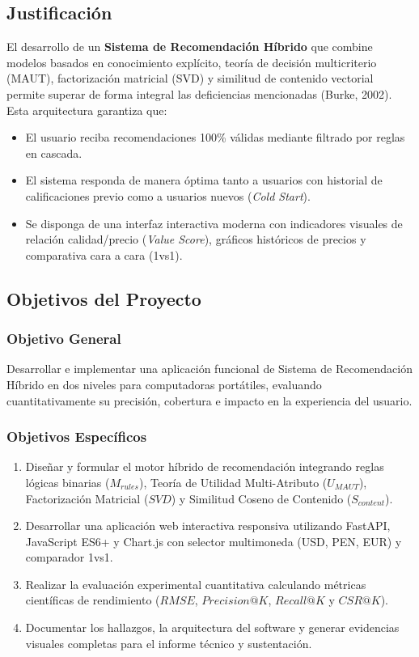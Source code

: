 \documentclass[12pt,a4paper]{article}
\begin{document}
\subsection{Justificación}
El desarrollo de un \textbf{Sistema de Recomendación Híbrido} que combine modelos basados en conocimiento explícito, teoría de decisión multicriterio (MAUT), factorización matricial (SVD) y similitud de contenido vectorial permite superar de forma integral las deficiencias mencionadas (Burke, 2002). Esta arquitectura garantiza que:
\begin{itemize}
    \item El usuario reciba recomendaciones 100\% válidas mediante filtrado por reglas en cascada.
    \item El sistema responda de manera óptima tanto a usuarios con historial de calificaciones previo como a usuarios nuevos (\textit{Cold Start}).
    \item Se disponga de una interfaz interactiva moderna con indicadores visuales de relación calidad/precio (\textit{Value Score}), gráficos históricos de precios y comparativa cara a cara (1vs1).
\end{itemize}

\subsection{Objetivos del Proyecto}

\subsubsection{Objetivo General}
Desarrollar e implementar una aplicación funcional de Sistema de Recomendación Híbrido en dos niveles para computadoras portátiles, evaluando cuantitativamente su precisión, cobertura e impacto en la experiencia del usuario.

\subsubsection{Objetivos Específicos}
\begin{enumerate}
    \item Diseñar y formular el motor híbrido de recomendación integrando reglas lógicas binarias ($M_{rules}$), Teoría de Utilidad Multi-Atributo ($U_{MAUT}$), Factorización Matricial ($SVD$) y Similitud Coseno de Contenido ($S_{content}$).
    \item Desarrollar una aplicación web interactiva responsiva utilizando FastAPI, JavaScript ES6+ y Chart.js con selector multimoneda (USD, PEN, EUR) y comparador 1vs1.
    \item Realizar la evaluación experimental cuantitativa calculando métricas científicas de rendimiento ($RMSE$, $Precision@K$, $Recall@K$ y $CSR@K$).
    \item Documentar los hallazgos, la arquitectura del software y generar evidencias visuales completas para el informe técnico y sustentación.
\end{enumerate}
\end{document}
